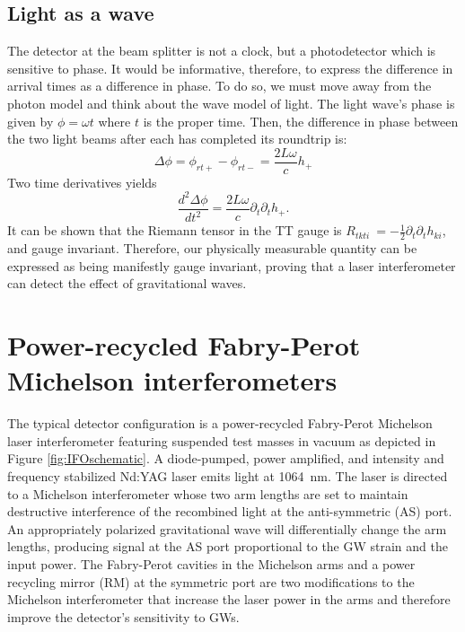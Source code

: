 \subsection{Light as a wave}
The detector at the beam splitter is not a clock, but a photodetector
which is sensitive to phase. It would be informative, therefore, to express
the difference in arrival times as a difference in phase. To do so, we
must move away from the photon model and think about the wave model of
light.  The light wave's phase is given by $\phi = \omega t$ where $t$ is the proper time. Then, the
difference in phase between the two light beams after each has
completed its roundtrip is:
\begin{equation}
\Delta \phi = \phi_{rt+} - \phi_{rt-} = \frac{2 L \omega}{c} h_+
\end{equation}
Two time derivatives yields 
\begin{equation}
\frac{d^2\Delta \phi}{dt^2} = \frac{2 L \omega}{c} \partial_t \partial_t h_+.
\end{equation}
It can be shown \cite{Garfinkle2005Gauge} that the Riemann tensor in
the TT gauge is $R_{tkti}~=-\frac{1}{2}\partial_t \partial_t h_{ki}$,
and gauge invariant. Therefore, our
physically measurable quantity can be expressed as being manifestly
gauge invariant, proving that a laser interferometer can detect the
effect of gravitational waves.






\section{Power-recycled Fabry-Perot Michelson interferometers}
The typical detector configuration is a power-recycled Fabry-Perot
Michelson laser interferometer featuring suspended test masses in
vacuum as depicted in Figure \ref{fig:IFOschematic}. A diode-pumped,
power amplified, and intensity and frequency stabilized Nd:YAG laser
emits light at 1064~nm. The laser is directed to a Michelson
interferometer whose two arm lengths are set to maintain destructive
interference of the recombined light at the anti-symmetric (AS)
port. An appropriately polarized gravitational wave will
differentially change the arm lengths, producing signal at the AS port
proportional to the GW strain and the input power. The Fabry-Perot
cavities in the Michelson arms and a power recycling mirror (RM) at
the symmetric port are two modifications to the Michelson
interferometer that increase the laser power in the arms and therefore
improve the detector's sensitivity to GWs.

